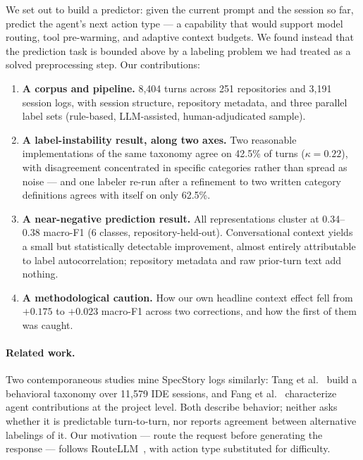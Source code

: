 \documentclass[10pt]{article}
\begin{document}
We set out to build a predictor: given the current prompt and the session so
far, predict the agent's next action type --- a capability that would support
model routing, tool pre-warming, and adaptive context budgets. We found instead
that the prediction task is bounded above by a labeling problem we had treated
as a solved preprocessing step. Our contributions:

\begin{enumerate}\itemsep1pt \parskip0pt 
\item \textbf{A corpus and pipeline.} 8{,}404 turns across 251 repositories and
3{,}191 session logs, with session structure, repository metadata, and three
parallel label sets (rule-based, LLM-assisted, human-adjudicated sample).
\item \textbf{A label-instability result, along two axes.} Two reasonable
implementations of the same taxonomy agree on 42.5\% of turns
($\kappa = 0.22$), with disagreement concentrated in specific categories rather
than spread as noise --- and one labeler re-run after a refinement to two written
category definitions agrees with itself on only 62.5\%.
\item \textbf{A near-negative prediction result.} All representations cluster at
0.34--0.38 macro-F1 (6 classes, repository-held-out). Conversational context
yields a small but statistically detectable improvement, almost entirely
attributable to label autocorrelation; repository metadata and raw prior-turn
text add nothing.
\item \textbf{A methodological caution.} How our own headline context effect fell
from $+0.175$ to $+0.023$ macro-F1 across two corrections, and how the first of
them was caught.
\end{enumerate}

\paragraph{Related work.} Two contemporaneous studies mine SpecStory logs
similarly: Tang et al.~\cite{tang2026programming} build a behavioral taxonomy
over 11{,}579 IDE sessions, and Fang et al.~\cite{fang2026conversation}
characterize agent contributions at the project level. Both describe behavior;
neither asks whether it is predictable turn-to-turn, nor reports agreement
between alternative labelings of it. Our motivation --- route the request before
generating the response --- follows RouteLLM~\cite{ong2024routellm}, with action
type substituted for difficulty.
\end{document}
